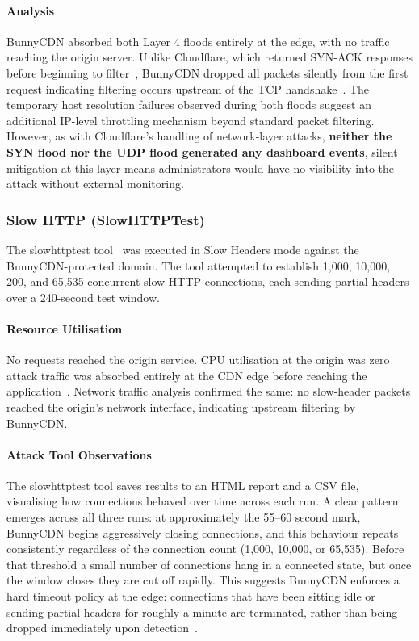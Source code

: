 \documentclass[12pt, a4paper]{report}   %
\begin{document}
\paragraph{Analysis}

BunnyCDN absorbed both Layer 4 floods entirely at the edge, with no traffic reaching
the origin server. Unlike Cloudflare, which returned SYN-ACK responses before
beginning to filter~\cite{cf-syn-flood}, BunnyCDN dropped all packets silently from 
the first request indicating filtering occurs upstream of the TCP 
handshake~\cite{bunny-shield-docs}. The temporary host resolution failures observed 
during both floods suggest an additional IP-level throttling mechanism beyond standard 
packet filtering. However, as with Cloudflare's handling of network-layer attacks, 
\textbf{neither the SYN flood nor the UDP flood generated any dashboard events}, 
silent mitigation at this layer means administrators would have no visibility into the 
attack without external monitoring.

\subsubsection{Slow HTTP (SlowHTTPTest)}

The slowhttptest tool~\cite{kali-slowhttp} was executed in Slow Headers mode against 
the BunnyCDN-protected domain. The tool attempted to establish 1,000, 10,000, 200, 
and 65,535 concurrent slow HTTP connections, each sending partial headers over a 
240-second test window.

\paragraph{Resource Utilisation}

No requests reached the origin service. CPU utilisation at the origin was zero
attack traffic was absorbed entirely at the CDN edge before reaching the 
application~\cite{bunny-shield-docs}. Network traffic analysis confirmed the same: no 
slow-header packets reached the origin's network interface, indicating upstream 
filtering by BunnyCDN.

\paragraph{Attack Tool Observations}

The slowhttptest tool saves results to an HTML report and a CSV file, visualising how
connections behaved over time across each run. A clear pattern emerges across all
three runs: at approximately the 55--60 second mark, BunnyCDN begins aggressively
closing connections, and this behaviour repeats consistently regardless of the
connection count (1,000, 10,000, or 65,535). Before that threshold a small number of
connections hang in a connected state, but once the window closes they are cut off
rapidly. This suggests BunnyCDN enforces a hard timeout policy at the edge: connections
that have been sitting idle or sending partial headers for roughly a minute are
terminated, rather than being dropped immediately upon detection~\cite{bunny-waf-docs}.
\end{document}
